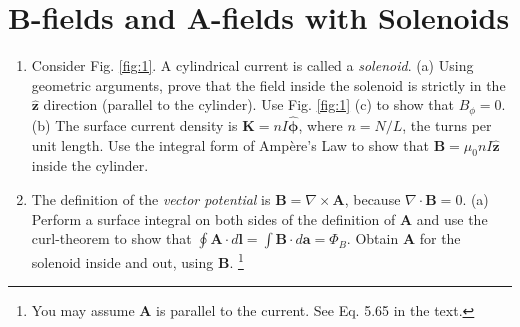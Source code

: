 \documentclass[12pt]{article}
\begin{document}
\section{B-fields and A-fields with Solenoids}

\begin{enumerate}
\item Consider Fig. \ref{fig:1}.  A cylindrical current is called a \textit{solenoid}.  (a) Using geometric arguments, prove that the field inside the solenoid is strictly in the $\hat{\mathbf{z}}$ direction (parallel to the cylinder). Use Fig. \ref{fig:1} (c) to show that $B_\phi = 0$. (b) The surface current density is $\mathbf{K} = n I\hat{\boldsymbol\phi}$, where $n = N/L$, the turns per unit length.  Use the integral form of Amp\`{e}re's Law to show that $\mathbf{B} = \mu_0 n I\hat{\mathbf{z}}$ inside the cylinder. \\ \vspace{2cm}
\item The definition of the \textit{vector potential} is $\mathbf{B} = \nabla \times \mathbf{A}$, because $\nabla \cdot \mathbf{B} = 0$. (a) Perform a surface integral on both sides of the definition of $\mathbf{A}$ and use the curl-theorem to show that $\oint \mathbf{A} \cdot d\mathbf{l} = \int \mathbf{B} \cdot d\mathbf{a} = \Phi_B$. Obtain $\mathbf{A}$ for the solenoid inside and out, using $\mathbf{B}$. \footnote{You may assume $\mathbf{A}$ is parallel to the current.  See Eq. 5.65 in the text.}
\end{enumerate}
\end{document}
